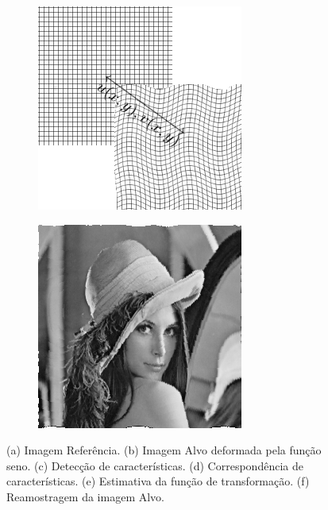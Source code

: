 \begin{figure}[H]
\begin{subfigure}[t]{0.3\textwidth}
      \includegraphics[width=\textwidth]{figuras/estimativa.png}
      \label{fig:estimativa}
    \end{subfigure}
    \begin{subfigure}[t]{0.3\textwidth}
      \includegraphics[width=\textwidth]{figuras/lenaRegistrada.png}
      \label{fig:lenaRegistrada}
    \end{subfigure}
    \caption{(a) Imagem Referência. (b) Imagem Alvo deformada pela função seno.
             (c) Detecção de características. (d) Correspondência de características.
             (e) Estimativa da função de transformação. (f) Reamostragem da imagem Alvo.}
    \label{fig:regExplicacao}
\end{figure}

